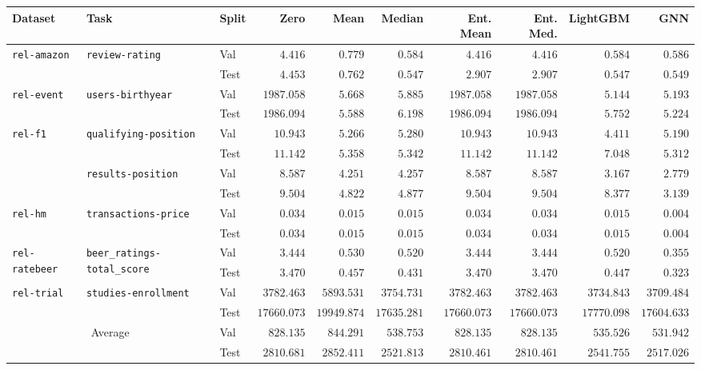 \begin{tabular}{lllrrrrrrr}
\toprule
Dataset & Task & Split & Zero & Mean & Median & Ent. Mean & Ent. Med. & LightGBM & GNN \\
\midrule
\multirow[c]{2}{*}{\texttt{rel-amazon}} & \multirow[c]{2}{*}{\texttt{review-rating}} & Val & $4.416$ & $0.779$ & $\bm{0.584}$ & $4.416$ & $4.416$ & $0.584$ & $0.586$ \\
 &  & Test & $4.453$ & $0.762$ & $\bm{0.547}$ & $2.907$ & $2.907$ & $0.547$ & $0.549$ \\
\cmidrule{1-10} \cmidrule{2-10}
\multirow[c]{2}{*}{\texttt{rel-event}} & \multirow[c]{2}{*}{\texttt{users-birthyear}} & Val & $1987.058$ & $5.668$ & $5.885$ & $1987.058$ & $1987.058$ & $\bm{5.144}$ & $5.193$ \\
 &  & Test & $1986.094$ & $5.588$ & $6.198$ & $1986.094$ & $1986.094$ & $5.752$ & $\bm{5.224}$ \\
\cmidrule{1-10} \cmidrule{2-10}
 \multirow[c]{4}{*}{\texttt{rel-f1}} & \multirow[c]{2}{*}{\texttt{qualifying-position}} & Val & $10.943$ & $5.266$ & $5.280$ & $10.943$ & $10.943$ & $\bm{4.411}$ & $5.190$ \\
 &  & Test & $11.142$ & $5.358$ & $5.342$ & $11.142$ & $11.142$ & $7.048$ & $\bm{5.312}$ \\
\cmidrule{2-10}
 & \multirow[c]{2}{*}{\texttt{results-position}} & Val & $8.587$ & $4.251$ & $4.257$ & $8.587$ & $8.587$ & $3.167$ & $\bm{2.779}$ \\
 &  & Test & $9.504$ & $4.822$ & $4.877$ & $9.504$ & $9.504$ & $8.377$ & $\bm{3.139}$ \\
\cmidrule{1-10} \cmidrule{2-10}
\multirow[c]{2}{*}{\texttt{rel-hm}} & \multirow[c]{2}{*}{\texttt{transactions-price}} & Val & $0.034$ & $0.015$ & $0.015$ & $0.034$ & $0.034$ & $0.015$ & $\bm{0.004}$ \\
 &  & Test & $0.034$ & $0.015$ & $0.015$ & $0.034$ & $0.034$ & $0.015$ & $\bm{0.004}$ \\
\cmidrule{1-10} \cmidrule{2-10}
\multirow[c]{2}{*}{\texttt{rel-ratebeer}} & \multirow[c]{2}{*}{\texttt{beer\_ratings-total\_score}} & Val & $3.444$ & $0.530$ & $0.520$ & $3.444$ & $3.444$ & $0.520$ & $\bm{0.355}$ \\
 &  & Test & $3.470$ & $0.457$ & $0.431$ & $3.470$ & $3.470$ & $0.447$ & $\bm{0.323}$ \\
\cmidrule{1-10} \cmidrule{2-10}
\multirow[c]{2}{*}{\texttt{rel-trial}} & \multirow[c]{2}{*}{\texttt{studies-enrollment}} & Val & $3782.463$ & $5893.531$ & $3754.731$ & $3782.463$ & $3782.463$ & $3734.843$ & $\bm{3709.484}$ \\
 &  & Test & $17660.073$ & $19949.874$ & $17635.281$ & $17660.073$ & $17660.073$ & $17770.098$ & $\bm{17604.633}$ \\
\cmidrule{1-10} \cmidrule{2-10}
\multicolumn{2}{c}{\multirow{2}{*}{Average}} & Val
& $828.135$ & $844.291$ & $538.753$ & $828.135$ & $828.135$ & $535.526$ & $531.942$ \\
 &  & Test & $2810.681$ & $2852.411$ & $2521.813$ & $2810.461$ & $2810.461$ & $2541.755$ & $2517.026$ \\
\bottomrule
\end{tabular}
